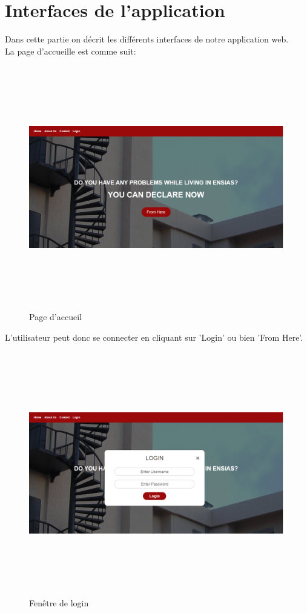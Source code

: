 \documentclass[11.5pt]{report}
\begin{document}
\section{Interfaces de l'application}
Dans cette partie on décrit les différents interfaces de notre application web.\\
La page d'accueille est comme suit:\\
\begin{figure}[h]
	
	\begin{center}
		\includegraphics[width=500pt,height=300pt]{home.png} 
		\caption{Page d'accueil}
	\end{center}
	
\end{figure}
\newpage
L'utilisateur peut donc se connecter en cliquant sur 'Login' ou bien 'From Here'.\\
\begin{figure}[h]
	
	\begin{center}
		\includegraphics[width=500pt,height=300pt]{login.png} 
		\caption{Fenêtre de login}
	\end{center}
	
\end{figure}
\end{document}
